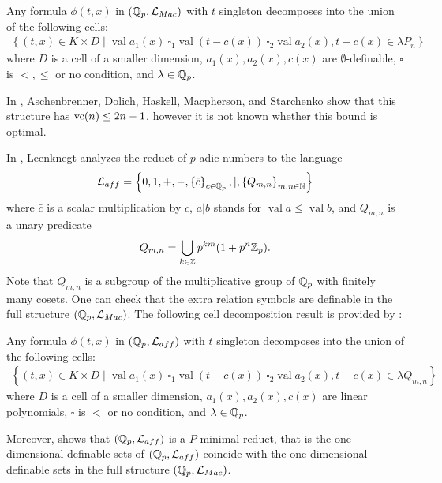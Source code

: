 \documentclass{amsart}
\renewcommand{\LL}{\mathcal L}
\newcommand{\LLM}{\mathcal L_{Mac}}
\newcommand{\curly}[1]{\left\{#1\right\}}
\DeclareMathOperator{\vval}{val}
\begin{document}
\begin{Theorem} [???]
  Any formula $\phi(t, x)$ in $(\Q_p, \LLM)$ with $t$ singleton decomposes into the union of the following cells:
  \begin{align*}
    \curly{(t, x) \in K \times D \mid \vval a_1(x) \ \square_1 \vval (t - c(x)) \ \square_2 \vval a_2(x), t - c(x) \in \lambda P_n}
  \end{align*}
  where $D$ is a cell of a smaller dimension,
  $a_1(x), a_2(x), c(x)$ are $\emptyset$-definable,
  $\square$ is $<, \leq$ or no condition, and
  $\lambda  \in\mathbb{Q}_p$.    
\end{Theorem}  

In \cite{density}, Aschenbrenner, Dolich, Haskell, Macpherson, and Starchenko show that this structure has $\operatorname{vc}(n) \leq 2n - 1$,
however it is not known whether this bound is optimal.

In \cite{reduct}, Leenknegt analyzes the reduct of $p$-adic numbers to the language
\begin{align*}
  \LL_{aff}  = \curly{0, 1, +, -, \curly{\bar c}_{c \in \Q_p}, |, \curly{Q_{m,n}}_{m,n\in \N}}
\end{align*}
where $\bar c$ is a scalar multiplication by $c$,
$a | b$ stands for $\vval a \leq \vval b$,
and $Q_{m,n}$ is a unary predicate
\begin{align*}
  Q_{m,n} = \bigcup_{k \in \mathbb{Z}} p^{km} (1 + p^n\mathbb{Z}_p).
\end{align*}
Note that $Q_{m,n}$ is a subgroup of the multiplicative group of $\mathbb{Q}_p$ with finitely many cosets.
One can check that the extra relation symbols are definable in the full structure $(\Q_p, \LLM)$.
The following cell decomposition result is provided by \cite{reduct}:

\begin{Theorem}
  Any formula $\phi(t, x)$ in $(\Q_p, \LL_{aff})$ with $t$ singleton decomposes into the union of the following cells:
  \begin{align*}
    \curly{(t, x) \in K \times D \mid \vval a_1(x) \ \square_1 \vval (t - c(x)) \ \square_2 \vval a_2(x), t - c(x) \in \lambda Q_{m,n} }
  \end{align*}
  where $D$ is a cell of a smaller dimension,
  $a_1(x), a_2(x), c(x)$ are linear polynomials,
  $\square$ is $<$ or no condition, and
  $\lambda  \in\mathbb{Q}_p$.
\end{Theorem}  

Moreover, \cite{reduct} shows that $(\Q_p, \LL_{aff})$ is a $P$-minimal reduct,
that is the one-dimensional definable sets of $(\Q_p, \LL_{aff})$ coincide with the one-dimensional definable sets in the full structure $(\Q_p, \LLM)$.
\end{document}
